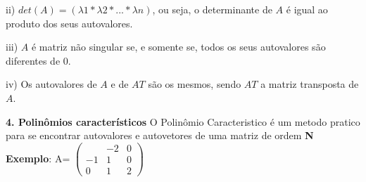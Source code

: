 \documentclass[11pt,a4paper]{article}
\newcommand\tab[1][1.835cm]{\hspace*{#1}}
\begin{document}
\begin{flushleft}
\tab ii) $det(A)=(\lambda 1*\lambda 2*...*\lambda n)$, ou seja, o determinante de $A$ é igual ao produto dos seus
autovalores. \linebreak

\tab iii) $A$ é matriz não singular se, e somente se, todos os seus autovalores são diferentes
de $0$. \linebreak

\tab iv) Os autovalores de $A$ e de $AT$ são os mesmos, sendo $AT$ a matriz transposta de $A$. \linebreak \pagebreak


\textbf{4. Polinômios característicos}\linebreak
\tab O Polinômio Caracteristico é um metodo pratico para se encontrar autovalores e autovetores de uma matriz  de ordem \textbf{N}\newline
\textbf{Exemplo}:\newline\newline
\tab A= $ \begin{pmatrix} & -2 &  0\\  -1& 1 & 0 \\ 0& 1 & 2 \end{pmatrix}$
\vspace*{3mm}


\end{flushleft}
\end{document}
